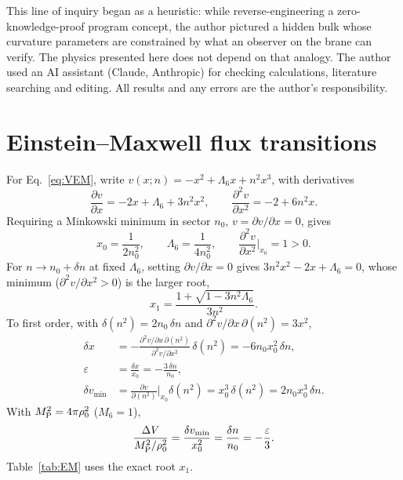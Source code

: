 \documentclass[aps,prd,reprint,superscriptaddress,nofootinbib,floatfix]{revtex4-2}
\theoremstyle{definition}
\newcommand{\MP}{M_{\rm P}}
\begin{document}
\begin{acknowledgments}
This line of inquiry began as a heuristic: while reverse-engineering a zero-knowledge-proof program concept, the author pictured a hidden bulk whose curvature parameters are constrained by what an observer on the brane can verify. The physics presented here does not depend on that analogy. The author used an AI assistant (Claude, Anthropic) for checking calculations, literature searching and editing. All results and any errors are the author's responsibility.
\end{acknowledgments}

\appendix
\section{Einstein--Maxwell flux transitions}\label{app:EM}

For Eq.~\eqref{eq:VEM}, write $v(x;n)=-x^2+\Lambda_6x+n^2x^3$, with derivatives
\begin{equation}
\frac{\partial v}{\partial x}=-2x+\Lambda_6+3n^2x^2,\qquad \frac{\partial^2 v}{\partial x^2}=-2+6n^2x.
\end{equation}
Requiring a Minkowski minimum in sector $n_0$, $v=\partial v/\partial x=0$, gives
\begin{equation}
x_0=\frac{1}{2n_0^2},\qquad \Lambda_6=\frac{1}{4n_0^2},\qquad \frac{\partial^2 v}{\partial x^2}\bigg|_{x_0}=1>0 .
\end{equation}
For $n\to n_0+\delta n$ at fixed $\Lambda_6$, setting $\partial v/\partial x=0$ gives $3n^2x^2-2x+\Lambda_6=0$, whose minimum ($\partial^2v/\partial x^2>0$) is the larger root,
\begin{equation}
x_1=\frac{1+\sqrt{1-3n^2\Lambda_6}}{3n^2}.
\end{equation}
To first order, with $\delta(n^2)=2n_0\,\delta n$ and $\partial^2v/\partial x\,\partial(n^2)=3x^2$,
\begin{align}
\delta x &= -\frac{\partial^2 v/\partial x\,\partial(n^2)}{\partial^2 v/\partial x^2}\,\delta(n^2) = -6n_0x_0^2\,\delta n,\\
\varepsilon &=\frac{\delta x}{x_0}=-\frac{3\,\delta n}{n_0},\\
\delta v_{\min} &= \frac{\partial v}{\partial(n^2)}\bigg|_{x_0}\delta(n^2)=x_0^3\,\delta(n^2)=2n_0x_0^3\,\delta n .
\end{align}
With $\MP^2=4\pi\rho_0^2$ ($M_6=1$),
\begin{equation}
\frac{\Delta V}{\MP^2/\rho_0^2}=\frac{\delta v_{\min}}{x_0^2}=\frac{\delta n}{n_0}=-\frac{\varepsilon}{3}.
\end{equation}
Table~\ref{tab:EM} uses the exact root $x_1$.
\end{document}
